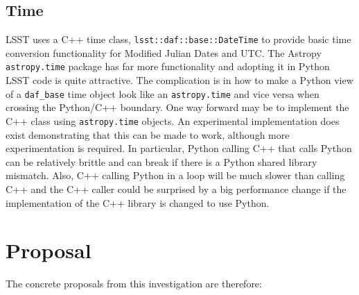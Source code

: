 \documentclass[]{spie}  %
\begin{document}
\subsection{Time}

LSST uses a C++ time class, \texttt{lsst::daf::base::DateTime} to provide basic time conversion functionality for Modified Julian Dates and UTC.
The Astropy \texttt{astropy.time} package has far more functionality and adopting it in Python LSST code is quite attractive.
The complication is in how to make a Python view of a \texttt{daf\_base} time object look like an \texttt{astropy.time} and vice versa when crossing the Python/C++ boundary.
One way forward may be to implement the C++ class using \texttt{astropy.time} objects.
An experimental implementation does exist demonstrating that this can be made to work, although more experimentation is required.
In particular, Python calling C++ that calls Python can be relatively brittle and can break if there is a Python shared library mismatch.
Also, C++ calling Python in a loop will be much slower than calling C++ and the C++ caller could be surprised by a big performance change if the implementation of the C++ library is changed to use Python.

\section{Proposal}

The concrete proposals from this investigation are therefore:
\end{document}
